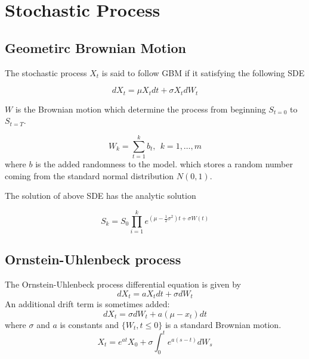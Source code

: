 \documentclass{article}
\begin{document}
		\section{Stochastic Process}
		\subsection{Geometirc Brownian Motion}
		
				The stochastic process $X_t$ is said to follow GBM if it satisfying the following SDE
				
				\begin{equation}
					dX_t = \mu X_tdt + \sigma X_t dW_t 
				\end{equation}
				
				$W$ is the Brownian motion which determine the process from beginning $S_{t=0}$ to $S_{t=T}$.
				
				\begin{equation}
					W_{k} = \sum_{t=1}^{k} b_{t}, \ \ k = 1, \dots, m
				\end{equation}
				 where $b$ is the added randomness to the model.
				 which stores a random number coming from the standard normal distribution $N(0, 1)$.
			
			The solution of above SDE has the analytic solution
			
			\begin{equation}
				S_{k} = S_{0} \prod_{i=1}^{k}e^{\left(\mu-\frac{1}{2}\sigma^{2}\right)t+\sigma W(t)}
			\end{equation}
			
			
				
				
	
	\subsection{Ornstein-Uhlenbeck process}
	The Ornstein-Uhlenbeck process differential equation is given by
	\begin{equation}
		dX_t = aX_tdt + \sigma dW_t 
		\label{eq:ornuh_diff}
	\end{equation}
	An additional drift term is sometimes added:
	\begin{equation}
	dX_t = \sigma dW_t +a (\mu-x_t)dt
	\label{eq:ornuh_diff_mean}
	\end{equation}
	where $\sigma$ and $a$ is constants and $\{W_t, t \leq 0\}$ is a standard Brownian motion.
	\begin{equation}
		X_t = e^{at}X_0 + \sigma \int_{0}^{t}e^{a(s-t)}dW_s
			\end{equation}
	
\end{document}
